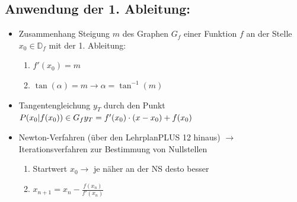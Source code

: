 \subsection{Anwendung der 1. Ableitung:}
\begin{itemize}
\item Zusammenhang Steigung $m$ des Graphen $G_f$ einer Funktion $f$ an der Stelle $x_0 \in \mathds{D}_f$ mit der 1. Ableitung:\\
\begin{enumerate}
\item $f'(x_0) = m$\\
\item $\tan{(\alpha)} = m \longrightarrow \alpha = \tan^{-1}{(m)}$
\end{enumerate}
\item Tangentengleichung $y_T$ durch den Punkt $P(x_0|f(x_0)) \in G_f \\y_T = f'(x_0)\cdot(x-x_0) + f(x_0) $
\item Newton-Verfahren (über den LehrplanPLUS 12 hinaus) $\longrightarrow$ Iterationsverfahren zur Bestimmung von Nullstellen\\
\begin{enumerate}
    \item Startwert $x_0 \longrightarrow $ je näher an der NS desto besser\\
    \item $x_{n+1} = x_n - \frac{f(x_n)}{f'(x_n)}$    
\end{enumerate}
\end{itemize}
